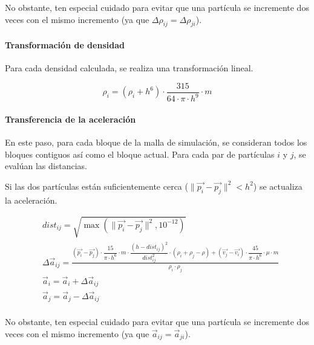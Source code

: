 No obstante, ten especial cuidado para evitar que una partícula se incremente dos
veces con el mismo incremento (ya que $\Delta \rho_{ij} = \Delta \rho_{ji}$).

\paragraph{Transformación de densidad}
Para cada densidad calculada, se realiza una transformación lineal.

\[
\rho_i = (\rho_i + h^6) \cdot \frac{315}{64 \cdot \pi \cdot h^9} \cdot m
\]

\paragraph{Transferencia de la aceleración}
En este paso, para cada bloque de la malla de simulación, se consideran todos 
los bloques contiguos así como el bloque actual. Para cada par de partículas
$i$ y $j$, se evalúan las distancias.

Si las dos partículas están suficientemente cerca 
($\|\vec{p_i} - \vec{p_j}\|^2 < h^2$) se actualiza la aceleración.

\[
\begin{split}
& dist_{ij} = \sqrt{\max(\|\vec{p_i} - \vec{p_j}\|^2, 10^{-12})} \\
& \Delta \vec{a}_{ij} = 
  \frac{
    (\vec{p_i} - \vec{p_j}) \cdot \dfrac{15}{\pi \cdot h^6} \cdot m \cdot 
    \dfrac{(h - dist_{ij})^2}{dist_{ij}^2} \cdot (\rho_i + \rho_j - \rho) +
    (\vec{v_j} - \vec{v_i}) \cdot \dfrac{45}{\pi \cdot h^6} \cdot \mu \cdot m
  }{
    \rho_i \cdot \rho_j    
  } \\
& \vec{a}_i = \vec{a}_i + \Delta \vec{a}_{ij}\\
& \vec{a}_j = \vec{a}_j - \Delta \vec{a}_{ij}\\
\end{split}
\]

No obstante, ten especial cuidado para evitar que una partícula se incremente dos
veces con el mismo incremento (ya que $\vec{a}_{ij} = \vec{a}_{ji}$).
